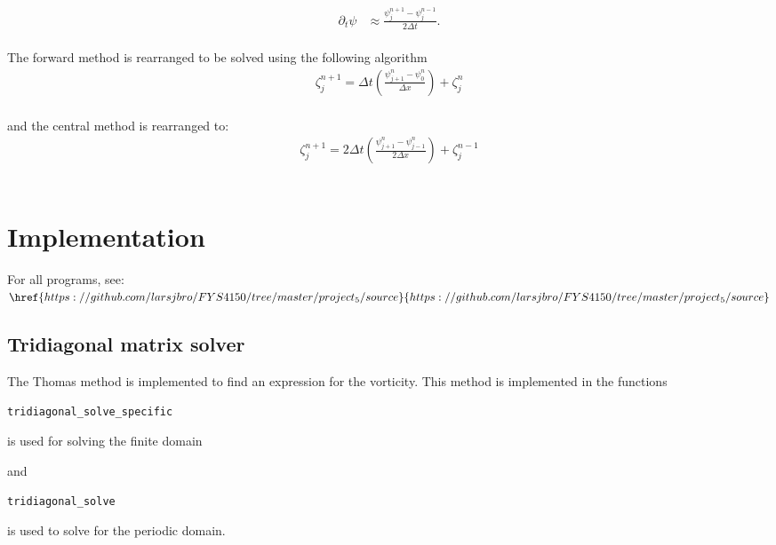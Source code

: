 \begin{align}
  \label{eq:Rossby4}
	\partial_t\psi &\approx \frac{\psi_{j}^{n+1} - \psi_{j}^{n-1}}{2\Delta t}.
\end{align}\\

The forward method is rearranged to be solved using the following algorithm\\

\begin{align}
\zeta_j^{n+1} = \Delta t(\frac{\psi_{j+1}^n-\psi_{0}^n}{\Delta x})+\zeta_j^{n}
\end{align}\\

and the central method is rearranged to:\\

\begin{align}
\zeta_j^{n+1} = 2\Delta t(\frac{\psi_{j+1}^n-\psi_{j-1}^n}{2\Delta x})+\zeta_j^{n-1}
\end{align}\\


 






\newpage
\section{Implementation}
For all programs, see:\\
$\href{https://github.com/larsjbro/FYS4150/tree/master/project_5/source}{https://github.com/larsjbro/FYS4150/tree/master/project_5/source}$


\subsection{Tridiagonal matrix solver}
The Thomas method is implemented to find an expression for the vorticity. This method is implemented in the functions

\begin{verbatim}
tridiagonal_solve_specific
\end{verbatim}

is used for solving the finite domain

and 

\begin{verbatim}
tridiagonal_solve
\end{verbatim}

is used to solve for the periodic domain.

